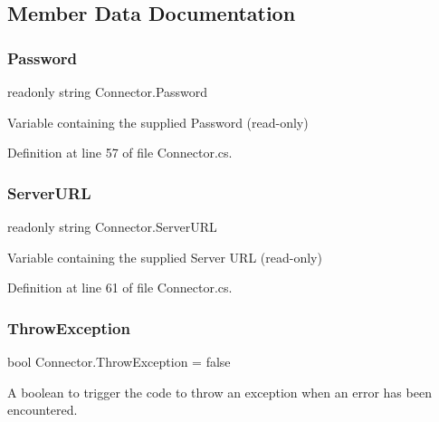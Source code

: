 \subsection{Member Data Documentation}
\mbox{\label{class_connector_a7dd469898462ef761d256392766461fe}} 
\subsubsection{\texorpdfstring{Password}{Password}}
{\footnotesize\ttfamily readonly string Connector.\+Password}



Variable containing the supplied Password (read-\/only) 



Definition at line 57 of file Connector.\+cs.

\mbox{\label{class_connector_ac0cae400459978dde8030f75208e48f1}} 
\subsubsection{\texorpdfstring{Server\+U\+RL}{ServerURL}}
{\footnotesize\ttfamily readonly string Connector.\+Server\+U\+RL}



Variable containing the supplied Server U\+RL (read-\/only) 



Definition at line 61 of file Connector.\+cs.

\mbox{\label{class_connector_a8ec0dcdbb4a85a56fa50f67686484c19}} 
\subsubsection{\texorpdfstring{Throw\+Exception}{ThrowException}}
{\footnotesize\ttfamily bool Connector.\+Throw\+Exception = false\hspace{0.3cm}{\ttfamily [static]}}



A boolean to trigger the code to throw an exception when an error has been encountered. 

